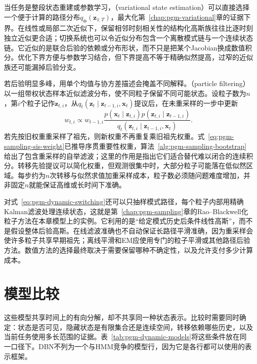 当任务是整段状态重建或参数学习，（variational state estimation）可以直接选择一个便于计算的路径分布$q_{\bm\phi}(\bm z_{1:T})$，最大化第~\ref{chap:pgm-variational}章的证据下界。在线性或局部二次近似下，保留相邻时刻相关性的结构化高斯族往往比逐时刻独立近似更合适；切换系统也可以令近似分布包含一个离散模式链与一个连续状态链。它近似的是联合后验的依赖或分布形状，而不只是把某个Jacobian换成数值积分。优化下界方便与参数学习结合，但下界提高不等于精确似然提高，过窄的近似族还可能漏掉后验分支。

若后验明显多峰，用单个均值与协方差描述会掩盖不同解释。（particle filtering）以一组带权状态样本近似滤波分布，使不同粒子保留不同可能状态。设粒子数为$n$，第$i$个粒子记作$\bm z_{t,i}$，从$q_t(\bm z_t\mid\bm z_{t-1,i},\bm x_t)$提议后，在未重采样的一步中更新
\[
  w_{t,i}\propto w_{t-1,i}
    \frac{p(\bm x_t\mid\bm z_{t,i})
      p(\bm z_{t,i}\mid\bm z_{t-1,i})}
      {q_t(\bm z_{t,i}\mid\bm z_{t-1,i},\bm x_t)}.
\]
若先按旧权重重采样了祖先，则新权重不再重复乘旧祖先权重。式~\eqref{eq:pgm-sampling-sis-weight}已推导序贯重要性权重，算法~\ref{alg:pgm-sampling-bootstrap}给出了包含重采样的自举滤波；这里的作用是指出它们适合替代难以闭合的连续积分。转移先验提议可以简化权重，但观测很集中时，大部分粒子可能落在低似然区域。每步约为$n$次转移与似然求值加重采样成本，粒子数必须随问题难度增加，并非固定$n$就能保证高维或长时间下准确。

对式~\eqref{eq:pgm-dynamic-switching}还可以只抽样模式路径，每个粒子内部用精确Kalman滤波处理连续状态，这就是第~\ref{chap:pgm-sampling}章的Rao--Blackwell化粒子方法在本章模型上的实例。它利用的是“给定模式历史后条件线性高斯”，而不是假设整体后验高斯。在线滤波准确也不自动保证长路径平滑准确，因为重采样会使许多粒子共享早期祖先；离线平滑和EM应使用专门的粒子平滑或其他路径后验方法。数值方法的选择最终取决于需要保留哪种不确定性，以及允许支付多少计算成本。

\section{模型比较}
\label{sec:pgm-dynamic-comparison}

这些模型共享时间上的有向分解，却不共享同一种状态表示。比较时需要同时确定：状态是否可见，隐藏状态是有限集合还是连续空间，转移依赖哪些历史，以及当前任务使用多长范围的证据。表~\ref{tab:pgm-dynamic-models}将这些条件放在同一口径下。DBN不列为一个与HMM竞争的模型行，因为它是各行都可以使用的表示框架。

